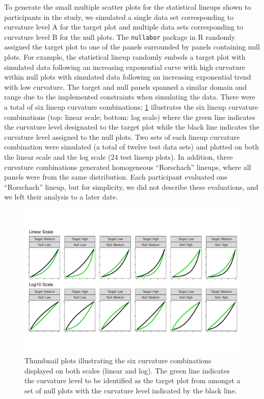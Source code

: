\documentclass[12pt]{article}
\begin{document}
To generate the small multiple scatter plots for the statistical lineups
shown to participants in the study, we simulated a single data set
corresponding to curvature level A for the target plot and multiple data
sets corresponding to curvature level B for the null plots. The
\texttt{nullabor} package in R \citep{nullabor} randomly assigned the
target plot to one of the panels surrounded by panels containing null
plots. For example, the statistical lineup randomly embeds a target plot
with simulated data following an increasing exponential curve with high
curvature within null plots with simulated data following an increasing
exponential trend with low curvature. The target and null panels spanned
a similar domain and range due to the implemented constraints when
simulating the data. There were a total of six lineup curvature
combinations; \cref{fig:curvature-combination-example} illustrates the
six lineup curvature combinations (top: linear scale; bottom: log scale)
where the green line indicates the curvature level designated to the
target plot while the black line indicates the curvature level assigned
to the null plots. Two sets of each lineup curvature combination were
simulated (a total of twelve test data sets) and plotted on both the
linear scale and the log scale (24 test lineup plots). In addition,
three curvature combinations generated homogeneous ``Rorschach''
lineups, where all panels were from the same distribution. Each
participant evaluated one ``Rorschach'' lineup, but for simplicity, we
did not describe these evaluations, and we left their analysis to a
later date.

\begin{figure}[tbp]

{\centering \includegraphics[width=1\linewidth,]{logarithmic-lineups_files/figure-latex/curvature-combination-example-1} 

}

\caption[Lineup curvature combinations]{Thumbnail plots illustrating the six curvature combinations displayed on both scales (linear and log). The green line indicates the curvature level to be identified as the target plot from amongst a set of null plots with the curvature level indicated by the black line.}\label{fig:curvature-combination-example}
\end{figure}
\end{document}

